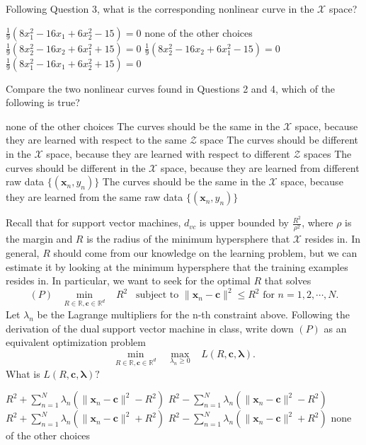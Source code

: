 \documentclass[a4paper,10pt]{exam}
\begin{document}
\begin{questions}
	 \question Following Question 3, what is the corresponding nonlinear curve in the $\mathcal{X}$ space?
	 \begin{checkboxes}
	 	\CorrectChoice $\frac{1}{9}(8x_1^2-16x_1+6x_2^2 - 15) = 0$
	 	\choice none of the other choices
	 	\choice $\frac{1}{9}(8x_2^2-16x_2+6x_1^2 + 15) = 0$
	 	\choice $\frac{1}{9}(8x_2^2-16x_2+6x_1^2 - 15) = 0$
	 	\choice $\frac{1}{9}(8x_1^2-16x_1+6x_2^2 + 15) = 0$\\
	 \end{checkboxes}
	 
	\question Compare the two nonlinear curves found in Questions 2 and 4, which of the following is true?
	\begin{checkboxes}
		\choice none of the other choices
		\choice The curves should be the same in the $\mathcal{X}$ space, because they are learned with respect to the same $\mathcal{Z}$ space
		\CorrectChoice The curves should be different in the $\mathcal{X}$ space, because they are learned with respect to different $\mathcal{Z}$ spaces
		\choice The curves should be different in the $\mathcal{X}$ space, because they are learned from different raw data $\{(\mathbf{x}_n, y_n)\}$
		\choice The curves should be the same in the $\mathcal{X}$ space, because they are learned from the same raw data $\{(\mathbf{x}_n, y_n)\}$\\
	\end{checkboxes}
	
	\question Recall that for support vector machines, $d_{vc}$ is upper bounded by $\frac{R^2}{\rho^2}$, where $\rho$ is the margin and $R$ is the radius of the minimum hypersphere that $\mathcal{X}$ resides in. In general, $R$ should come from our knowledge on the learning problem, but we can estimate it by looking at the minimum hypersphere that the training examples resides in. In particular, we want to seek for the optimal $R$ that solves \[(P) \; \; \; \min_{R \in \mathbb{R}, \mathbf{c} \in \mathbb{R}^d} \; \; \; R^2 \; \; \; \mbox{subject to } \|\mathbf{x}_n - \mathbf{c}\|^2 \le R^2 \mbox{ for } n = 1, 2, \cdots, N.\]
	Let $\lambda_n$ be the Lagrange multipliers for the n-th constraint above. Following the derivation of the dual support vector machine in class, write down $(P)$ as an equivalent optimization problem \[\min_{R \in \mathbb{R}, \mathbf{c} \in \mathbb{R}^d} \;\;\; \max_{\lambda_n \ge 0} \;\;\; L(R, \mathbf{c}, {\boldsymbol\lambda}).\] What is $L(R, \mathbf{c}, {\boldsymbol\lambda})?$
	
	\begin{checkboxes}
		\CorrectChoice $R^2 + \sum_{n=1}^N \lambda_n( \|\mathbf{x}_n - \mathbf{c}\|^2 - R^2)$
		\choice $R^2 - \sum_{n=1}^N \lambda_n( \|\mathbf{x}_n - \mathbf{c}\|^2 - R^2)$
		\choice $R^2 + \sum_{n=1}^N \lambda_n( \|\mathbf{x}_n - \mathbf{c}\|^2 + R^2)$
		\choice $R^2 - \sum_{n=1}^N \lambda_n( \|\mathbf{x}_n - \mathbf{c}\|^2 + R^2)$
		\choice none of the other choices\\
	\end{checkboxes}
	

\end{questions}
\end{document}
